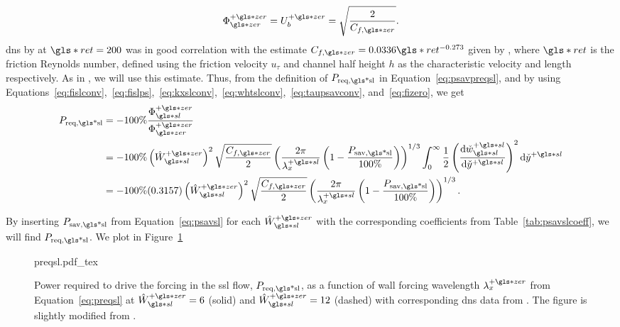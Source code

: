 \begin{equation}
	\Phi\pz\zz=U_b\pz=\sqrt{\frac{2}{C_{f,\gls*{zer}}}} \label{eq:fizero}
.\end{equation}
\gls{dns} by \textcite{viotti2009} at $\gls*{ret}=200$ was in good correlation with the estimate $C_{f,\gls*{zer}}=0.0336 \gls*{ret}^{-0.273}$ given by \cite{pope2001}, where $\gls*{ret}$ is the friction Reynolds number, defined using the friction velocity $u_\tau$ and channel half height  $h$ as the characteristic velocity and length respectively. As in \cite{viotti2009,chernyshenko2013}, we will use this estimate.
Thus, from the definition of $P_\text{req,\gls*{sl}} $ in Equation~\eqref{eq:psavpreqsl}, and by using Equations~\eqref{eq:fislconv},~\eqref{eq:fislps},~\eqref{eq:kxslconv},~\eqref{eq:whtslconv},~\eqref{eq:taupsavconv}, and~\eqref{eq:fizero}, we get
\begin{align}
	P_\text{req,\gls*{sl}}&=-100\%\frac{\Phi \pz\ssl}{\Phi \pz\zz}\\
			      &=-100\%\left( \hat{W}\ssl\pz \right)^2 \sqrt{\frac{C_{f,\gls*{zer}}}{2}} \left( \frac{2\pi}{\lambda_x\ps}\left( 1-\frac{P_\text{sav,\gls*{sl}} }{100\%} \right)  \right) ^{1 /3}  \int_{0}^{\infty}\frac{1}{2} \left( \dv{\check{w}\ssl\ps}{\check{y}\ps}  \right) ^2 \dd{\check{y}\ps}\\
			      &=-100\%(0.3157)\left( \hat{W}\ssl\pz \right)^2 \sqrt{\frac{C_{f,\gls*{zer}}}{2}} \left( \frac{2\pi}{\lambda_x\ps}\left( 1-\frac{P_\text{sav,\gls*{sl}} }{100\%} \right)  \right) ^{1 /3}\label{eq:preqsl}
.\end{align}

By inserting $P_\text{sav,\gls*{sl}} $ from Equation~\eqref{eq:psavsl} for each $\hat{W}\ssl\pz$ with the corresponding coefficients from Table~\ref{tab:psavslcoeff}, we will find $P_\text{req,\gls*{sl}} $. We plot  in Figure~\ref{fig:preqsl}

\begin{figure}[htbp]
	\centering
	\def\svgwidth{0.7\textwidth}
	{preqsl.pdf_tex}
	\caption[$P_\text{req,\gls*{sl}} $ as a function of wall forcing wavelength $\lambda_x\pz$]{Power required to drive the forcing in the  \gls{ssl} flow, $P_\text{req,\gls*{sl}} $, as a function of wall forcing wavelength $\lambda_x\pz$ from Equation~\eqref{eq:preqsl} at $\hat{W}\pz\ssl=6$ (solid) and $\hat{W}\pz\ssl=12$ (dashed) with corresponding \gls{dns} data from \textcite{viotti2009}. The figure is slightly modified from \cite{chernyshenko2013}.} 
	\label{fig:preqsl}
\end{figure}

